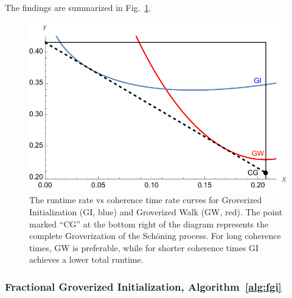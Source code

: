 \documentclass[a4paper,aps,floatfix]{revtex4}
\begin{document}
The findings are summarized in Fig.~\ref{fig:gw_tradeoffs}.

\begin{figure}[ht]
    \begin{center}
			\includegraphics[scale=.6]{images/gw-tradeoffs2.pdf}
    \end{center}
		\caption{\label{fig:gw_tradeoffs} 
			The runtime rate vs coherence time rate curves for 
			Groverized Initialization (GI, blue) and
			Groverized Walk (GW, red).
			The point marked ``CG'' at the bottom right of the diagram represents the complete Groverization of the Sch\"oning process.
			For long coherence times, GW is preferable, while for shorter coherence times GI achieves a lower total runtime.
		}
\end{figure}

\subsubsection{Fractional Groverized Initialization, Algorithm~\ref{alg:fgi}}
\label{sec:fgi}
\end{document}

